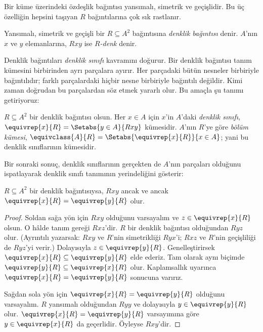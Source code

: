 \documentclass[../../../include/open-logic-section]{subfiles}
\begin{document}


Bir küme üzerindeki özdeşlik bağıntısı yansımalı, simetrik ve geçişlidir. Bu üç
özelliğin hepsini taşıyan $R$ bağıntılarına çok sık rastlanır.

\begin{defn}
Yansımalı, simetrik ve geçişli bir $R \subseteq A^2$ bağıntısına \emph{denklik
bağıntısı} denir. $A$'nın $x$ ve $y$ elemanlarına, $Rxy$ ise
\emph{$R$-denk} denir.
\end{defn}

Denklik bağıntıları \emph{denklik sınıfı} kavramını doğurur. Bir denklik
bağıntısı tanım kümesini birbirinden ayrı parçalara ayırır. Her parçadaki bütün
nesneler birbiriyle bağıntılıdır; farklı parçalardaki hiçbir nesne birbiriyle
bağıntılı değildir. Kimi zaman doğrudan bu parçalardan söz etmek yararlı olur.
Bu amaçla şu tanımı getiriyoruz:

\begin{defn}
$R \subseteq A^2$ bir denklik bağıntısı olsun. Her $x \in A$ için $x$'in
$A$'daki \emph{denklik sınıfı},
$\equivrep{x}{R}=\Setabs{y \in A}{Rxy}$ kümesidir. $A$'nın $R$'ye göre
\emph{bölüm kümesi},
$\equivclass{A}{R}=\Setabs{\equivrep{x}{R}}{x \in A}$; yani bu denklik
sınıflarının kümesidir.
\end{defn}

Bir sonraki sonuç, denklik sınıflarının gerçekten de $A$'nın parçaları
olduğunu ispatlayarak denklik sınıfı tanımının yerindeliğini gösterir:

\begin{prop}
$R \subseteq A^2$ bir denklik bağıntısıysa, $Rxy$ ancak ve ancak
$\equivrep{x}{R}=\equivrep{y}{R}$ olur.
\end{prop}

\begin{proof}
Soldan sağa yön için $Rxy$ olduğunu varsayalım ve
$z \in \equivrep{x}{R}$ olsun. O hâlde tanım gereği $Rxz$'dir. $R$ bir denklik
bağıntısı olduğundan $Ryz$ olur. (Ayrıntılı yazarsak: $Rxy$ ve $R$'nin
simetrikliği $Ryx$'i; $Rxz$ ve $R$'nin geçişliliği de $Ryz$'yi verir.)
Dolayısıyla $z \in \equivrep{y}{R}$. Genelleştirirsek
$\equivrep{x}{R} \subseteq \equivrep{y}{R}$ elde ederiz. Tam olarak aynı
biçimde $\equivrep{y}{R} \subseteq \equivrep{x}{R}$ olur. Kaplamsallık
uyarınca $\equivrep{x}{R}=\equivrep{y}{R}$ sonucuna varırız.

Sağdan sola yön için $\equivrep{x}{R}=\equivrep{y}{R}$ olduğunu varsayalım.
$R$ yansımalı olduğundan $Ryy$ ve dolayısıyla
$y \in \equivrep{y}{R}$ olur. $\equivrep{x}{R}=\equivrep{y}{R}$ varsayımına
göre $y \in \equivrep{x}{R}$ da geçerlidir. Öyleyse $Rxy$'dir.
\end{proof}
\end{document}
